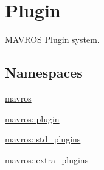 \hypertarget{group__plugin}{}\section{Plugin}
\label{group__plugin}


M\+A\+V\+R\+OS Plugin system.  


\subsection*{Namespaces}
\begin{DoxyCompactItemize}
\item 
 \mbox{\hyperlink{namespacemavros}{mavros}}
\item 
 \mbox{\hyperlink{namespacemavros_1_1plugin}{mavros\+::plugin}}
\item 
 \mbox{\hyperlink{namespacemavros_1_1std__plugins}{mavros\+::std\+\_\+plugins}}
\item 
 \mbox{\hyperlink{namespacemavros_1_1extra__plugins}{mavros\+::extra\+\_\+plugins}}
\end{DoxyCompactItemize}
